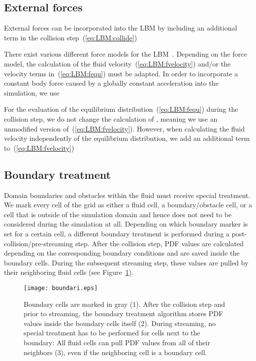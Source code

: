 \documentclass[final,leqno,onefignum,onetabnum]{siamltex1213}
\begin{document}
\subsection{External forces}\label{sec:LBM:forces}

External forces can be
incorporated into the LBM 
by including an additional term in
the collision step~(\ref{eq:LBM:collide})

There exist various different force models for the LBM~\cite{Mohamad2010990}.
Depending on the force model, the calculation of the fluid velocity~(\ref{eq:LBM:fvelocity}) and/or the velocity terms in~(\ref{eq:LBM:fequ})
must be adapted. In order to incorporate a constant body force  caused by a globally constant acceleration  into the simulation, we use

For the evaluation of the equilibrium distribution~(\ref{eq:LBM:fequ}) during the collision step, we do not change the calculation of ,
meaning we use an unmodified version of~(\ref{eq:LBM:fvelocity}).
However, when calculating the fluid velocity independently of the equilibrium distribution, we add an additional term to~(\ref{eq:LBM:fvelocity})~\cite{Ginzburg2008}


\subsection{Boundary treatment}\label{sec:LBM:boundaries}

Domain boundaries and obstacles within the fluid must receive special treatment.
We mark every cell of the grid as either a fluid cell, a boundary/obstacle cell, or a cell that is outside of the simulation domain and hence does not need to be considered during the simulation at all.
Depending on which boundary marker is set for a certain cell, a different boundary treatment is performed
during a post-collision/pre-streaming step.
After the collision step, PDF values are calculated depending on the corresponding boundary conditions and are saved inside the boundary cells.
During the subsequent streaming step, these values are pulled by their neighboring fluid cells (see Figure~\ref{fig:boundaries}).

\begin{figure}[tbp]
  \centering
  \texttt{[image: boundari.eps]}
  \caption{Boundary cells are marked in gray (1). After the collision step and prior to streaming, the boundary treatment algorithm stores PDF values inside the boundary cells itself (2). During streaming, no special treatment has to be performed for cells next to the boundary: All fluid cells can pull PDF values from all of their neighbors (3), even if the neighboring cell is a boundary cell.}
  \label{fig:boundaries}
\end{figure}
\end{document}
